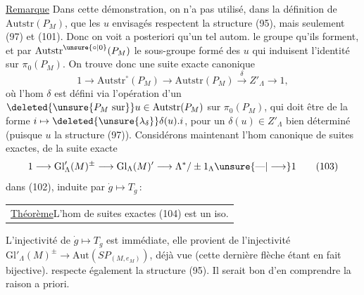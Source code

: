 \uline{Remarque} Dans cette démonstration, on n'a pas utilisé, dans la définition de $\mathrm{Autstr}(P_M)$, que les $u$ envisagés respectent la structure (95), mais seulement (97) et (101). 
Donc on voit a posteriori qu'un tel autom.
le groupe qu'ils forment, et par $\mathrm{Autstr}^{\unsure{\circ|0}}(P_M)$ le sous-groupe formé des $u$ qui induisent l'identité sur $\pi_0(P_M)$. On trouve donc une suite exacte canonique
\[
1\longrightarrow\mathrm{Autstr}^\circ(P_M)\longrightarrow\mathrm{Autstr}(P_M)\xrightarrow{\delta} Z'_\Lambda\longrightarrow1,\tag*{(102)}
\]
où l'hom $\delta$ est défini via l'opération d'un $\deleted{\unsure{P_M\ \mathrm{sur}}}u\in\mathrm{Autstr}(P_M)$ sur $\pi_0(P_M)$, qui doit être de la forme $i\mapsto\deleted{\unsure{\lambda_\delta}}\delta(u).i$, pour un $\delta(u)\in Z'_\Lambda$ bien déterminé (puisque $u$  la structure (97)). Considérons maintenant l'hom canonique de suites exactes,  de la suite exacte
\[
1\longrightarrow\mathrm{Gl}'_\Lambda(M)^\pm\longrightarrow\mathrm{Gl}_\Lambda(M)'\longrightarrow\Lambda^*/\pm1_\Lambda\unsure{\text{---}|\longrightarrow}1\tag*{(103)}
\]
dans (102), induite par $\dot g\mapsto T_{\dot g}$\,:


\noindent\begin{tabular}{|p{.91\linewidth}}
\uline{Théorème}\quad L'hom de suites exactes (104) est un iso.
\end{tabular}

L'injectivité de $\dot g\mapsto T_{\dot g}$ est immédiate, elle provient de l'injectivité  $\mathrm{Gl}'_\Lambda(M)^\pm\longrightarrow\mathrm{Aut}(SP_{(M,e_M)})$, déjà vue (cette dernière flèche étant en fait bijective).
respecte également la structure (95). Il serait bon d'en comprendre la raison a priori.

